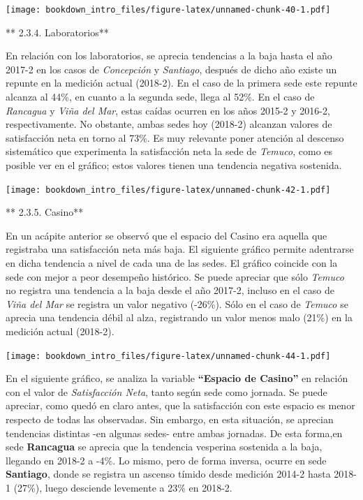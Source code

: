 \documentclass[]{book}
\begin{document}
\texttt{[image: bookdown\_intro\_files/figure-latex/unnamed-chunk-40-1.pdf]}

** 2.3.4. Laboratorios**

En relación con los laboratorios, se aprecia tendencias a la baja hasta
el año 2017-2 en los casos de \emph{Concepción} y \emph{Santiago},
después de dicho año existe un repunte en la medición actual (2018-2).
En el caso de la primera sede este repunte alcanza al 44\%, en cuanto a
la segunda sede, llega al 52\%. En el caso de \emph{Rancagua} y
\emph{Viña del Mar}, estas caídas ocurren en los años 2015-2 y 2016-2,
respectivamente. No obstante, ambas sedes hoy (2018-2) alcanzan valores
de satisfacción neta en torno al 73\%. Es muy relevante poner atención
al descenso sistemático que experimenta la satisfacción neta la sede de
\emph{Temuco}, como es posible ver en el gráfico; estos valores tienen
una tendencia negativa sostenida.

\texttt{[image: bookdown\_intro\_files/figure-latex/unnamed-chunk-42-1.pdf]}

** 2.3.5. Casino**

En un acápite anterior se observó que el espacio del Casino era aquella
que registraba una satisfacción neta más baja. El siguiente gráfico
permite adentrarse en dicha tendencia a nivel de cada una de las sedes.
El gráfico coincide con la sede con mejor a peor desempeño histórico. Se
puede apreciar que sólo \emph{Temuco} no registra una tendencia a la
baja desde el año 2017-2, incluso en el caso de \emph{Viña del Mar} se
registra un valor negativo (-26\%). Sólo en el caso de \emph{Temuco} se
aprecia una tendencia débil al alza, registrando un valor menos malo
(21\%) en la medición actual (2018-2).

\texttt{[image: bookdown\_intro\_files/figure-latex/unnamed-chunk-44-1.pdf]}

En el siguiente gráfico, se analiza la variable \textbf{``Espacio de
Casino''} en relación con el valor de \emph{Satisfacción Neta}, tanto
según sede como jornada. Se puede apreciar, como quedó en claro antes,
que la satisfacción con este espacio es menor respecto de todas las
observadas. Sin embargo, en esta situación, se aprecian tendencias
distintas -en algunas sedes- entre ambas jornadas. De esta forma,en sede
\textbf{Rancagua} se aprecia que la tendencia vesperina sostenida a la
baja, llegando en 2018-2 a -4\%. Lo mismo, pero de forma inversa, ocurre
en sede \textbf{Santiago}, donde se registra un ascenso tímido desde
medición 2014-2 hasta 2018-1 (27\%), luego desciende levemente a 23\% en
2018-2.
\end{document}
